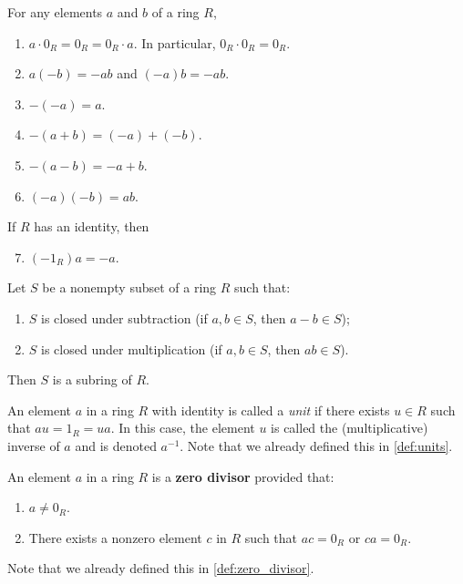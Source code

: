 \documentclass[../main.tex]{subfiles}
\begin{document}
\begin{proposition}
For any elements $a$ and $b$ of a ring $R$,
\begin{enumerate}
    \item $a \cdot 0_R = 0_R = 0_R \cdot a$. In particular, $0_R \cdot 0_R = 0_R$.
    \item $a(-b) = -ab$ \quad and \quad $(-a)b = -ab$.
    \item $-(-a) = a$.
    \item $-(a + b) = (-a) + (-b)$.
    \item $-(a - b) = -a + b$.
    \item $(-a)(-b) = ab$.
\end{enumerate}
If $R$ has an identity, then
\begin{enumerate}
    \setcounter{enumi}{6}
    \item $(-1_R)a = -a$.
\end{enumerate}
\end{proposition}



\begin{proposition}[Subring]
Let $S$ be a nonempty subset of a ring $R$ such that:
\begin{enumerate}
    \item $S$ is closed under subtraction (if $a, b \in S$, then $a - b \in S$);
    \item $S$ is closed under multiplication (if $a, b \in S$, then $ab \in S$).
\end{enumerate}
Then $S$ is a subring of $R$.
\end{proposition}






\begin{definition}
An element $a$ in a ring $R$ with identity is called a \textit{unit} if there exists $u \in R$ such that $au = 1_R = ua$. In this case, the element $u$ is called the (multiplicative) inverse of $a$ and is denoted $a^{-1}$. Note that we already defined this in \ref{def:units}.
\end{definition}







\begin{definition}
An element $a$ in a ring $R$ is a \textbf{zero divisor} provided that:
\begin{enumerate}
    \item $a \neq 0_R$.
    \item There exists a nonzero element $c$ in $R$ such that $ac = 0_R$ or $ca = 0_R$.
\end{enumerate}
Note that we already defined this in \ref{def:zero_divisor}.
\end{definition}
\end{document}
